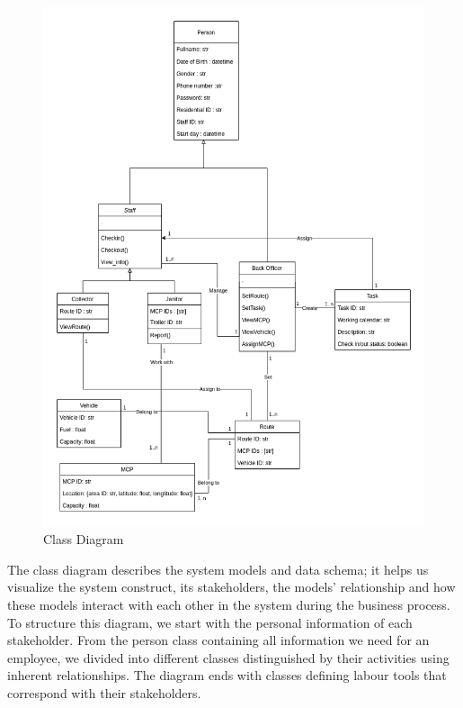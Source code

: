 \documentclass[a4paper, 13pt]{article}
\begin{document}
    \begin{figure}[!ht]
        \centering
        \includegraphics[scale=0.45]{system-modeling/diagramClass.png}
        \caption{Class Diagram}
        \label{fig:my_label}
    \end{figure}
    \begin{tcolorbox}[colback=blue!5!white,colframe=blue!75!black]
The class diagram describes the system models and data schema; it helps us visualize the system construct, its stakeholders, the models' relationship and how these models interact with each other in the system during the business process. To structure this diagram, we start with the personal information of each stakeholder. From the person class containing all information we need for an employee, we divided into different classes distinguished by their activities using inherent relationships. The diagram ends with classes defining labour tools that correspond with their stakeholders. 
\end{tcolorbox}
\end{document}
